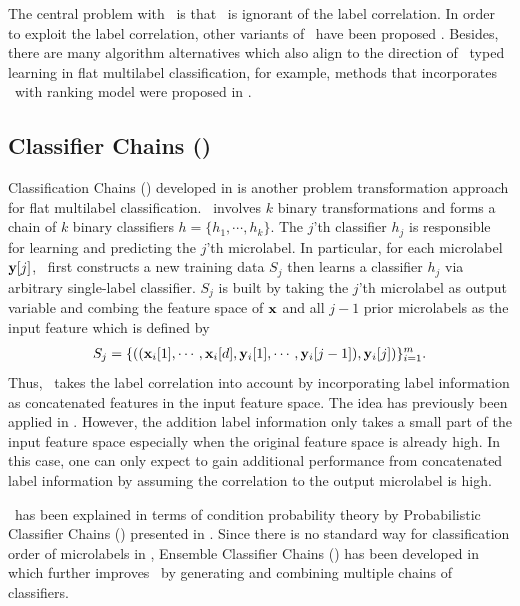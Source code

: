 {The central problem with \mlknn\ is that \mlknn\ is ignorant of the label correlation.
In order to exploit the label correlation, other variants of \mlknn\ have been proposed \citep{Cheng09combining,Younes11a}.
Besides, there are many algorithm alternatives which also align to the direction of \knn\ typed learning in flat multilabel classification, for example, methods that incorporates \knn\ with ranking model were proposed in \citep{Brinker07case,Chiang12a}.


%
%
\subsection{Classifier Chains (\cc)}

Classification Chains (\cc) developed in \citep{Read09classifier,Read11classifier} is another problem transformation approach for flat multilabel classification.
\cc\ involves $k$ binary transformations and forms a chain of $k$ binary classifiers $h=\{h_1,\cdots,h_k\}$.
The $j$'th classifier $h_j$ is responsible for learning and predicting the $j$'th microlabel.
In particular, for each microlabel $\mathbf {y}[j]$, \cc\ first constructs a new training data $S_j$ then learns a classifier $h_j$ via arbitrary single-label classifier.
$S_j$ is built by taking the $j$'th microlabel as output variable and combing the feature space of $\mathbf {x}$ and all $j-1$ prior microlabels as the input feature which is defined by
\begin{align*}
	S_j = \{((\mathbf {x}_i[1],\cdots,\mathbf {x}_i[d],\mathbf {y}_i[1],\cdots,\mathbf {y}_i[j-1]),\mathbf {y}_i[j])\}_{i=1}^{m}.
\end{align*} 
Thus, \cc\ takes the label correlation into account by incorporating label information as concatenated features in the input feature space.
The idea has previously been applied in \citep{Godbole04discriminative}.
However, the addition label information only takes a small part of the input feature space especially when the original feature space is already high.
In this case, one can only expect to gain additional performance from concatenated label information by assuming the correlation to the output microlabel is high.

\cc\ has been explained in terms of condition probability theory by Probabilistic Classifier Chains (\pcc) presented in \citep{Read09classifier,Dembczynski10bayes}.
Since there is no standard way for classification order of microlabels in \cc, Ensemble Classifier Chains (\ecc) has been developed in \citep{Read11classifier} which further improves \cc\ by generating and combining multiple chains of classifiers. 


}
